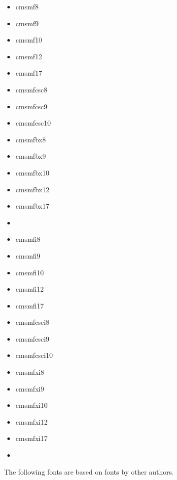 \documentclass{amsart}
\begin{document}
\noindent\parbox[t]{0.25\textwidth}{
\begin{itemize}
\item \textsf{cmsmf8}
\item \textsf{cmsmf9}
\item \textsf{cmsmf10}
\item \textsf{cmsmf12}
\item \textsf{cmsmf17}
\item \textsf{cmsmfcsc8}
\item \textsf{cmsmfcsc9}
\item \textsf{cmsmfcsc10}
\end{itemize}}\parbox[t]{0.25\textwidth}{\begin{itemize}
\item \textsf{cmsmfbx8}
\item \textsf{cmsmfbx9}
\item \textsf{cmsmfbx10}
\item \textsf{cmsmfbx12}
\item \textsf{cmsmfbx17}
\item \noindent{}
\end{itemize}}\parbox[t]{0.25\textwidth}{\begin{itemize}
\item \textsf{cmsmfi8}
\item \textsf{cmsmfi9}
\item \textsf{cmsmfi10}
\item \textsf{cmsmfi12}
\item \textsf{cmsmfi17}
\item \textsf{cmsmfcsci8}
\item \textsf{cmsmfcsci9}
\item \textsf{cmsmfcsci10}
\end{itemize}}\parbox[t]{0.25\textwidth}{\begin{itemize}
\item \textsf{cmsmfxi8}
\item \textsf{cmsmfxi9}
\item \textsf{cmsmfxi10}
\item \textsf{cmsmfxi12}
\item \textsf{cmsmfxi17}
\item \noindent{}
\end{itemize}}


\bigskip


The following fonts are based on fonts by other authors.

\nobreak
\end{document}
